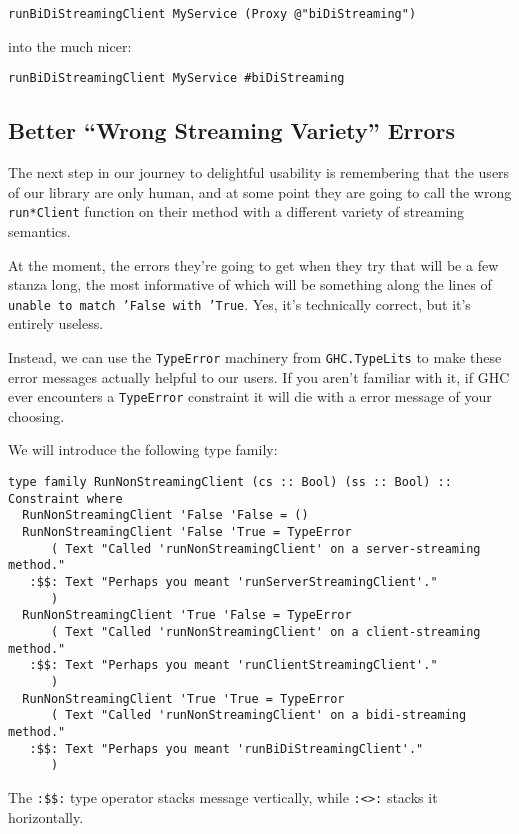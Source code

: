 {\begin{verbatim}
runBiDiStreamingClient MyService (Proxy @"biDiStreaming")
\end{verbatim}
into the much nicer:

\begin{verbatim}
runBiDiStreamingClient MyService #biDiStreaming
\end{verbatim}


\subsection{Better ``Wrong Streaming Variety'' Errors}

The next step in our journey to delightful usability is remembering that the users of our library are only human, and at some point they are going to call the wrong \texttt{run*Client} function on their method with a different variety of streaming semantics.

At the moment, the errors they're going to get when they try that will be a few stanza long, the most informative of which will be something along the lines of \texttt{unable to match 'False with 'True}. Yes, it's technically correct, but it's entirely useless.

Instead, we can use the \texttt{TypeError} machinery from \texttt{GHC.TypeLits} to make these error messages actually helpful to our users. If you aren't familiar with it, if GHC ever encounters a \texttt{TypeError} constraint it will die with a error message of your choosing.

We will introduce the following type family:

\begin{verbatim}
type family RunNonStreamingClient (cs :: Bool) (ss :: Bool) :: Constraint where
  RunNonStreamingClient 'False 'False = ()
  RunNonStreamingClient 'False 'True = TypeError
      ( Text "Called 'runNonStreamingClient' on a server-streaming method."
   :$$: Text "Perhaps you meant 'runServerStreamingClient'."
      )
  RunNonStreamingClient 'True 'False = TypeError
      ( Text "Called 'runNonStreamingClient' on a client-streaming method."
   :$$: Text "Perhaps you meant 'runClientStreamingClient'."
      )
  RunNonStreamingClient 'True 'True = TypeError
      ( Text "Called 'runNonStreamingClient' on a bidi-streaming method."
   :$$: Text "Perhaps you meant 'runBiDiStreamingClient'."
      )
\end{verbatim}
The \texttt{:\$\$:} type operator stacks message vertically, while \texttt{:<>:} stacks it horizontally.

}
